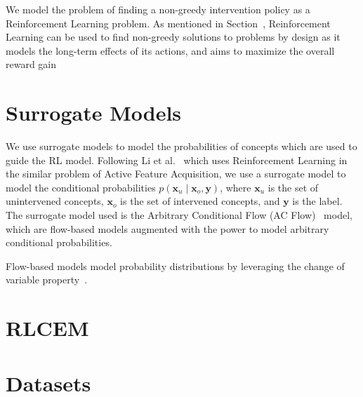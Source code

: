\documentclass[../main.tex]{subfiles}
\begin{document}
We model the problem of finding a non-greedy intervention policy as a 
Reinforcement Learning problem. As mentioned in Section~\cite{background:rl},
Reinforcement Learning can be used to find non-greedy solutions to problems
by design as it models the long-term effects of its actions, and aims to 
maximize the overall reward gain 


\section{Surrogate Models}

We use surrogate models to model the probabilities of concepts which are used
to guide the RL model. Following Li et al.~\cite{afa} which uses Reinforcement Learning
in the similar problem of Active Feature Acquisition, we use a surrogate model to model
the conditional probabilities $p(\mathbf{x}_u \mid \mathbf{x}_o, \mathbf{y})$, 
where $\mathbf{x}_u$ is the set of unintervened concepts, $\mathbf{x}_o$ is the set of intervened concepts,
and $\mathbf{y}$ is the label. The surrogate model used is the Arbitrary Conditional Flow (AC Flow)~\cite{acflow}
model, which are flow-based models augmented with the power to model arbitrary conditional probabilities.

Flow-based models model probability distributions by leveraging the change of variable property~\cite{flow}.


\section{RLCEM}\label{method:rlcem}

\section{Datasets}
\end{document}
